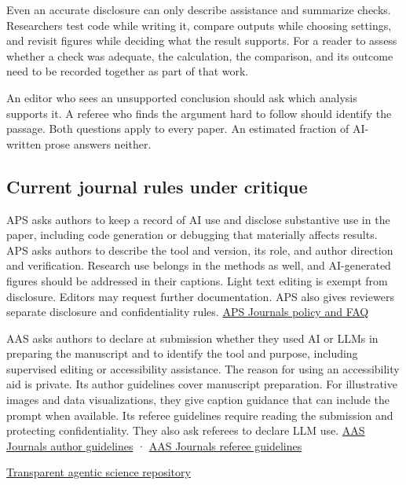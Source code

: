 \documentclass[11pt]{article}
\begin{document}
Even an accurate disclosure can only describe assistance and summarize
checks. Researchers test code while writing it, compare outputs while
choosing settings, and revisit figures while deciding what the result
supports. For a reader to assess whether a check was adequate, the
calculation, the comparison, and its outcome need to be recorded
together as part of that work.

An editor who sees an unsupported conclusion should ask which analysis
supports it. A referee who finds the argument hard to follow should
identify the passage. Both questions apply to every paper. An estimated
fraction of AI-written prose answers neither.

\subsection{Current journal rules under
critique}\label{current-journal-rules-under-critique}

APS asks authors to keep a record of AI use and disclose substantive use
in the paper, including code generation or debugging that materially
affects results. APS asks authors to describe the tool and version, its
role, and author direction and verification. Research use belongs in the
methods as well, and AI-generated figures should be addressed in their
captions. Light text editing is exempt from disclosure. Editors may
request further documentation. APS also gives reviewers separate
disclosure and confidentiality rules.
\href{https://journals.aps.org/authors/appropriate-use-ai-tools}{APS
Journals policy and FAQ}

AAS asks authors to declare at submission whether they used AI or LLMs
in preparing the manuscript and to identify the tool and purpose,
including supervised editing or accessibility assistance. The reason for
using an accessibility aid is private. Its author guidelines cover
manuscript preparation. For illustrative images and data visualizations,
they give caption guidance that can include the prompt when available.
Its referee guidelines require reading the submission and protecting
confidentiality. They also ask referees to declare LLM use.
\href{https://journals.aas.org/author-llm-guidelines}{AAS Journals
author guidelines} ·
\href{https://journals.aas.org/referee-llm-guidelines}{AAS Journals
referee guidelines}

\href{https://github.com/oshaughnessy-junior/whitepaper-transparent-agentic-science}{Transparent
agentic science repository}
\end{document}
